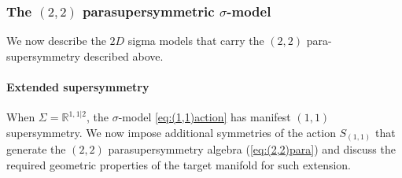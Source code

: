 \documentclass[letterpaper,12pt]{article}
\newcommand{\RR}{\mathbb{R}}
\newcommand{\p}{\partial}
\theoremstyle{definition}
\theoremstyle{remark}
\theoremstyle{examples}
\begin{document}
\subsubsection{The $(2,2)$ parasupersymmetric $\sigma$-model}
We now describe the $2D$ sigma models that carry the $(2,2)$ para-supersymmetry described above.
\paragraph{Extended supersymmetry}

When $\Sigma = \RR^{1,1|2}$, the $\sigma$-model \eqref{eq:(1,1)action} has manifest $(1,1)$ supersymmetry.  We now impose additional symmetries of the action $S_{(1,1)}$ that generate the $(2,2)$ parasupersymmetry algebra (\ref{eq:(2,2)para}) and discuss the required geometric properties of the target manifold for such extension.
\end{document}
